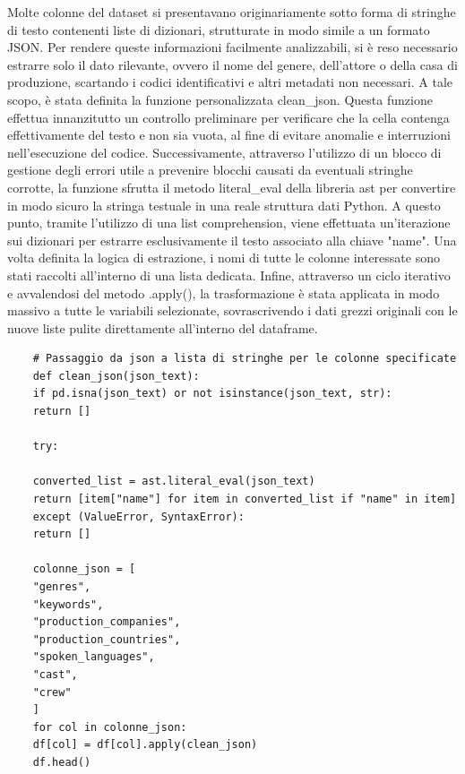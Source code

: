\documentclass{article}
\begin{document}
Molte colonne del dataset si presentavano originariamente sotto forma di stringhe di testo contenenti liste di dizionari, strutturate in modo simile a un formato JSON. Per rendere queste informazioni facilmente analizzabili, si \`e reso necessario estrarre solo il dato rilevante, ovvero il nome del genere, dell'attore o della casa di produzione, scartando i codici identificativi e altri metadati non necessari. A tale scopo, \`e stata definita la funzione personalizzata clean\_json. Questa funzione effettua innanzitutto un controllo preliminare per verificare che la cella contenga effettivamente del testo e non sia vuota, al fine di evitare anomalie e interruzioni nell'esecuzione del codice. Successivamente, attraverso l'utilizzo di un blocco di gestione degli errori utile a prevenire blocchi causati da eventuali stringhe corrotte, la funzione sfrutta il metodo literal\_eval della libreria ast per convertire in modo sicuro la stringa testuale in una reale struttura dati Python. A questo punto, tramite l'utilizzo di una list comprehension, viene effettuata un'iterazione sui dizionari per estrarre esclusivamente il testo associato alla chiave "name". Una volta definita la logica di estrazione, i nomi di tutte le colonne interessate sono stati raccolti all'interno di una lista dedicata. Infine, attraverso un ciclo iterativo e avvalendosi del metodo .apply(), la trasformazione \`e stata applicata in modo massivo a tutte le variabili selezionate, sovrascrivendo i dati grezzi originali con le nuove liste pulite direttamente all'interno del dataframe.
\begin{lstlisting}
	# Passaggio da json a lista di stringhe per le colonne specificate
	def clean_json(json_text):
	if pd.isna(json_text) or not isinstance(json_text, str):
	return []
	
	try:
	
	converted_list = ast.literal_eval(json_text)
	return [item["name"] for item in converted_list if "name" in item]
	except (ValueError, SyntaxError):
	return []
	
	colonne_json = [
	"genres",
	"keywords",
	"production_companies",
	"production_countries",
	"spoken_languages",
	"cast",
	"crew"
	]
	for col in colonne_json:
	df[col] = df[col].apply(clean_json)
	df.head() 
\end{lstlisting}
\end{document}
